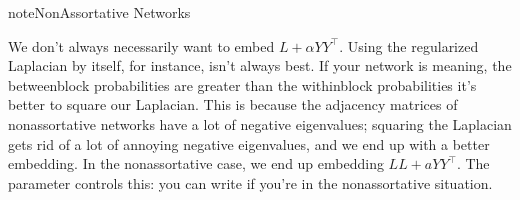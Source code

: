 \documentclass[letterpaper,10pt,english]{jupyterBook}
\begin{document}
\begin{sphinxadmonition}{note}{Non\sphinxhyphen{}Assortative Networks}

\sphinxAtStartPar
We don’t always necessarily want to embed \(L + \alpha YY^\top\). Using the regularized Laplacian by itself, for instance, isn’t always best. If your network is  \sphinxhyphen{} meaning, the between\sphinxhyphen{}block probabilities are greater than the within\sphinxhyphen{}block probabilities \sphinxhyphen{} it’s better to square our Laplacian. This is because the adjacency matrices of non\sphinxhyphen{}assortative networks have a lot of negative eigenvalues; squaring the Laplacian gets rid of a lot of annoying negative eigenvalues, and we end up with a better embedding. In the non\sphinxhyphen{}assortative case, we end up embedding \(LL + aYY^\top\). The  parameter controls this: you can write  if you’re in the non\sphinxhyphen{}assortative situation.
\end{sphinxadmonition}

\begin{sphinxVerbatim}[commandchars=\\\{\}]
     

   
   
  
\end{sphinxVerbatim}

\noindent{}
\end{document}
